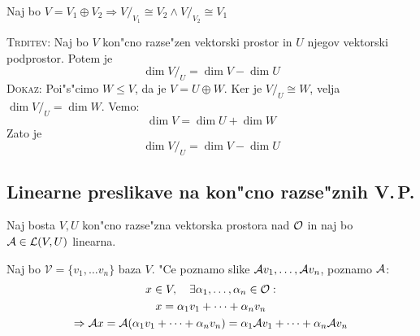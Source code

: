 Naj bo $V= V_1 \oplus V_2 \Rightarrow V/_{V_1} \cong V_2 \land V/_{V_2} \cong V_1$

\textsc{Trditev:} Naj bo $V$ kon"cno razse"zen vektorski prostor in $U$ njegov vektorski podprostor. Potem je
\begin{equation*}
\dim V/_U = \dim V - \dim U
\end{equation*}
\textsc{Dokaz:} Poi"s"cimo $W \leq V$, da je $V = U \oplus W$. Ker je $V/_U \cong W$, velja $\dim V/_U = \dim W$. Vemo:
\begin{equation*}
\dim V = \dim U + \dim W
\end{equation*}
Zato je
\begin{equation*}
\dim V/_U = \dim V - \dim U
\end{equation*}
%
\subsection{Linearne preslikave na kon"cno razse"znih V.\,P.}
Naj bosta $V, U$ kon"cno razse"zna vektorska prostora nad $\mathcal{O}$ in naj bo $\mathcal{A} \in \mathcal{L} (V, U)$ linearna.

Naj bo $\mathcal{V} = \{v_1, \ldots v_n\}$ baza $V$. "Ce poznamo slike $\mathcal{A} v_1, \ldots, \mathcal{A} v_n$, poznamo $\mathcal{A}$:
\begin{gather*}
x \in V, \quad \exists \alpha_1, \ldots, \alpha_n \in \mathcal{O}: \\
x = \alpha_1 v_1 + \cdots + \alpha_n v_n \\
\Rightarrow \mathcal{A} x = \mathcal{A}(\alpha_1 v_1 + \cdots + \alpha_n v_n) = \alpha_1 \mathcal{A} v_1 + \cdots +  \alpha_n \mathcal{A} v_n
\end{gather*}
